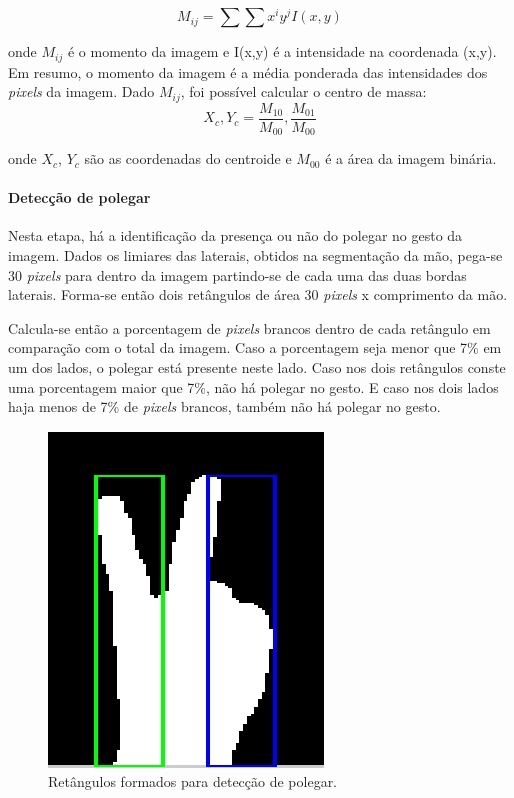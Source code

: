 \documentclass[conference]{IEEEtran}
\begin{document}
\begin{equation}\label{eqeq}
    M_{ij} = \sum{\sum{x^{i}y^{j}I(x,y)}}
\end{equation}

onde $M_{ij}$ é o momento da imagem e I(x,y) é a intensidade na coordenada (x,y). Em resumo, o momento da imagem é a média ponderada das intensidades dos \textit{pixels} da imagem. Dado $M_{ij}$, foi possível calcular o centro de massa:
\begin{equation}\label{eqeq}
    {X_{c},Y_{c}= {\frac{M_{10}}{M_{00}},\frac{M_{01}}{M_{00}}}}
\end{equation}

onde $X_{c}$, $Y_{c}$ são as coordenadas do centroide e $M_{00}$ é a área da imagem binária.
\paragraph{Detecção de polegar}
\par Nesta etapa, há a identificação da presença ou não do polegar no gesto da imagem. Dados os limiares das laterais, obtidos na segmentação da mão, pega-se 30 \textit{pixels} para dentro da imagem partindo-se de cada uma das duas bordas laterais. Forma-se então dois retângulos de área 30 \textit{pixels} x comprimento da mão.
\par Calcula-se então a porcentagem de \textit{pixels} brancos dentro de cada retângulo em comparação com o total da imagem. Caso a porcentagem seja menor que 7\% em um dos lados, o polegar está presente neste lado. Caso nos dois retângulos conste uma porcentagem maior que 7\%, não há polegar no gesto. E caso nos dois lados haja menos de 7\% de \textit{pixels} brancos, também não há polegar no gesto.

\begin{figure}
\centering
  \centering
  \includegraphics[width=.4\linewidth]{figs/thumb.jpg}
  \caption{Retângulos formados para detecção de polegar.}
\end{figure}
\end{document}
